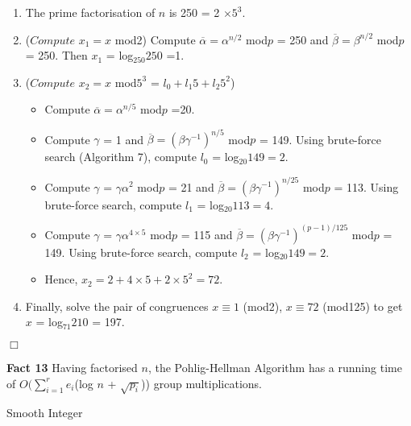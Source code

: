 \documentclass[iwp,first]{luthesis}
\begin{document}
\begin{enumerate}

\item The prime factorisation of $n$ is 250 = 2 $\times 5^3$.

\item ($Compute$ $x_1 = x$ mod2) Compute $\overline{\alpha} = \alpha^{n/2}$ mod$p$ = 250 and $\overline{\beta} = \beta^{n/2}$ mod$p$ = 250. Then $x_1$ = log$_{250}250$ =1.

\item ($Compute$ $x_2 = x$ mod$5^3$ = $l_0 + l_{1}5 + l_{2}5^2$)

\begin{itemize}

\item Compute $\overline{\alpha} = \alpha^{n/5}$ mod$p$ =20.

\item Compute $\gamma$ = 1 and $\overline{\beta} = (\beta\gamma^{-1})^{n/5}$ mod$p$ = 149. Using brute-force search (Algorithm 7), compute $l_0$ = log$_{20}149 = 2$.

\item Compute $\gamma$ = $\gamma\alpha^{2}$ mod$p$ = 21 and $\overline{\beta} = (\beta\gamma^{-1})^{n/25}$ mod$p$ = 113. Using brute-force search, compute $l_1$ = log$_{20}113 = 4$.

\item Compute $\gamma$ = $\gamma\alpha^{4 \times 5}$ mod$p$ = 115 and $\overline{\beta} = (\beta\gamma^{-1})^{(p-1)/125}$ mod$p$ = 149. Using brute-force search, compute $l_2$ = log$_{20}149 = 2$.

\item Hence, $x_2 = 2 + 4 \times 5 + 2 \times 5^2 = 72$.

\end{itemize}

\item Finally, solve the pair of congruences $x \equiv 1$ (mod2), $x \equiv 72$ (mod125) to get $x$ = log$_{71}210$ = 197.

\end{enumerate}
\hfill $\Box$

\textbf{Fact 13} Having factorised $n$, the Pohlig-Hellman Algorithm has a running time of $O(\displaystyle\sum\nolimits_{i = 1}^r e_i$(log $n$ + $\sqrt{p_i}$)) group multiplications.
\\
\begin{mydef}
Smooth Integer
\end{mydef}
\end{document}
